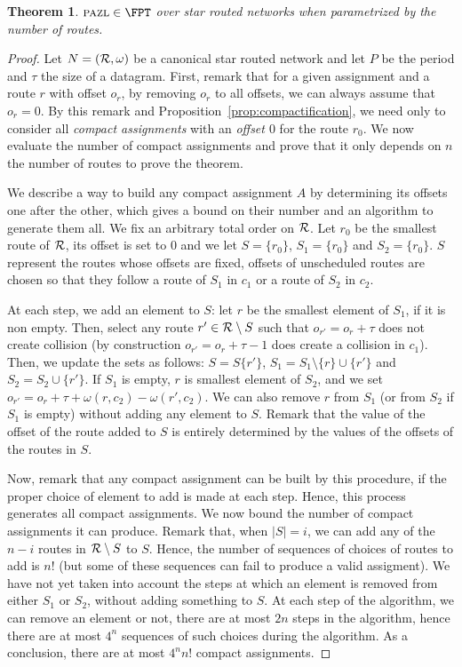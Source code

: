 \documentclass[a4paper,10pt]{article}
\newtheorem{theorem}{Theorem}
\newcommand\pazl{\textsc{pazl}\xspace}
\begin{document}
\begin{theorem}\label{th:FPT}
$\pazl \in \FPT$ over star routed networks when parametrized by the number of routes.
\end{theorem}
\begin{proof}
Let $N = ({\cal R},\omega)$ be a canonical star routed network and let $P$ be the period and $\tau$ the size of a datagram. First, remark that for a given assignment and a route $r$ with offset $o_r$, by removing $o_r$ to all offsets, we can always assume that $o_r = 0$. By this remark and Proposition~\ref{prop:compactification}, we need only to consider all \emph{compact assignments} with an \emph{offset $0$} for the route $r_0$. We now evaluate the number of compact assignments and prove that it only depends on $n$ the number of routes to prove the theorem.

 We describe a way to build any compact assignment $A$ by determining its offsets one after the other, which gives a bound on their number and an algorithm to generate them all. We fix an arbitrary total order on ${\cal R}$. Let $r_0$ be the smallest route of $\cal{R}$, its offset is set to $0$ and we let $S = \{r_0\}$,
 $S_1 = \{r_0\}$ and $S_2 = \{r_0\}$. $S$ represent the routes whose offsets are fixed, 
 offsets of unscheduled routes are chosen so that they follow a route of $S_1$ in $c_1$ or a route of $S_2$ in $c_2$.

 At each step, we add an element to $S$: let $r$ be the smallest element of $S_1$, if it is non empty. Then, select any route $r' \in {\cal R} \setminus S$ 
 such that $o_{r'} = o_{r} + \tau$ does not create collision (by construction $o_{r'} = o_{r} + \tau - 1$ does create a collision in $c_1$). Then, we update the sets as follows:
 $S = S \{r'\}$, $S_1 = S_1 \setminus \{r\} \cup \{r'\}$ and $S_2 = S_2 \cup \{r'\}$. If 
 $S_1$ is empty, $r$ is smallest element of $S_2$, and we set $o_{r'} = o_{r} + \tau + \omega(r,c_2) - \omega(r',c_2)$.
 We can also remove $r$ from $S_1$ (or from $S_2$ if $S_1$ is empty) without adding any element to $S$. Remark that the value of the offset of the route added to $S$ is entirely determined by the values of the offsets of the routes in $S$.

 Now, remark that any compact assignment can be built by this procedure, if the proper choice of element to add is made at each step. Hence, this process generates all compact assignments. We now bound the number of compact assignments it can produce. Remark that, when $|S| = i$, we can add any of the $n-i$ routes in ${\cal R} \setminus S$ to $S$. Hence, the number of sequences of choices of routes to add is $n!$ (but some of these sequences can fail to produce a valid assigment). We have not yet taken into account the steps at which an element is removed from either $S_1$ or $S_2$, without adding something to $S$. At each step of the algorithm, we can remove an element or not, there are at most $2n$ steps in the algorithm, hence there are at most $4^n$ sequences of such choices during the algorithm. As a conclusion, there are at most $4^nn!$ compact assignments.


\end{proof}
\end{document}
